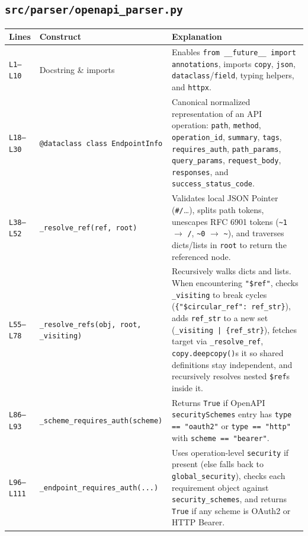 \documentclass[11pt,a4paper]{article}
\begin{document}
\subsection{\texttt{src/parser/openapi\_parser.py}}
\begin{longtable}{L{1.4cm} L{5.2cm} L{9.0cm}}
\toprule
\textbf{Lines} & \textbf{Construct} & \textbf{Explanation} \\
\midrule
\endhead
\texttt{L1--L10} & Docstring \& imports & Enables \texttt{from \_\_future\_\_ import annotations}, imports \texttt{copy}, \texttt{json}, \texttt{dataclass}/\texttt{field}, typing helpers, and \texttt{httpx}. \\
\texttt{L18--L30} & \texttt{@dataclass class EndpointInfo} & Canonical normalized representation of an API operation: \texttt{path}, \texttt{method}, \texttt{operation\_id}, \texttt{summary}, \texttt{tags}, \texttt{requires\_auth}, \texttt{path\_params}, \texttt{query\_params}, \texttt{request\_body}, \texttt{responses}, and \texttt{success\_status\_code}. \\
\texttt{L38--L52} & \texttt{\_resolve\_ref(ref, root)} & Validates local JSON Pointer (\texttt{\#/}\ldots), splits path tokens, unescapes RFC 6901 tokens (\texttt{\textasciitilde{}1} $\rightarrow$ \texttt{/}, \texttt{\textasciitilde{}0} $\rightarrow$ \texttt{\textasciitilde{}}), and traverses dicts/lists in \texttt{root} to return the referenced node. \\
\texttt{L55--L78} & \texttt{\_resolve\_refs(obj, root, \_visiting)} & Recursively walks dicts and lists. When encountering \texttt{"\$ref"}, checks \texttt{\_visiting} to break cycles (\texttt{\{"\$circular\_ref": ref\_str\}}), adds \texttt{ref\_str} to a new set (\texttt{\_visiting | \{ref\_str\}}), fetches target via \texttt{\_resolve\_ref}, \texttt{copy.deepcopy()}s it so shared definitions stay independent, and recursively resolves nested \texttt{\$ref}s inside it. \\
\texttt{L86--L93} & \texttt{\_scheme\_requires\_auth(scheme)} & Returns \texttt{True} if OpenAPI \texttt{securitySchemes} entry has \texttt{type == "oauth2"} or \texttt{type == "http"} with \texttt{scheme == "bearer"}. \\
\texttt{L96--L111} & \texttt{\_endpoint\_requires\_auth(...)} & Uses operation-level \texttt{security} if present (else falls back to \texttt{global\_security}), checks each requirement object against \texttt{security\_schemes}, and returns \texttt{True} if any scheme is OAuth2 or HTTP Bearer. \\

\end{longtable}
\end{document}
